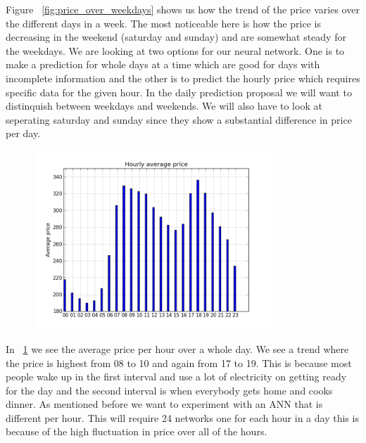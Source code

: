 Figure ~\ref{fig:price_over_weekdays} shows us how the trend of the price varies over the different days in a week. The most noticeable here is how the price is decreasing in the weekend (saturday and sunday) and are somewhat steady for the weekdays. We are looking at two options for our neural network. One is to make a prediction for whole days at a time which are good for days with incomplete information and the other is to predict the hourly price which requires specific data for the given hour. In the daily prediction proposal we will want to distinquish between weekdays and weekends. We will also have to look at seperating saturday and sunday since they show a substantial difference in price per day.

\begin{figure}[H]
\centering
\includegraphics[width=0.8\textwidth ,natwidth=410,natheight=237]{billeder/energy_price_plots/price_per_hour.png}
\caption{}
\label{fig:price_per_hour}
\end{figure}

In ~\ref{fig:price_per_hour} we see the average price per hour over a whole day. We see a trend where the price is highest from 08 to 10 and again from 17 to 19. This is because most people wake up in the first interval and use a lot of electricity on getting ready for the day and the second interval is when everybody gets home and cooks dinner. As mentioned before we want to experiment with an ANN that is different per hour. This will require 24 networks one for each hour in a day this is because of the high fluctuation in price over all of the hours.

